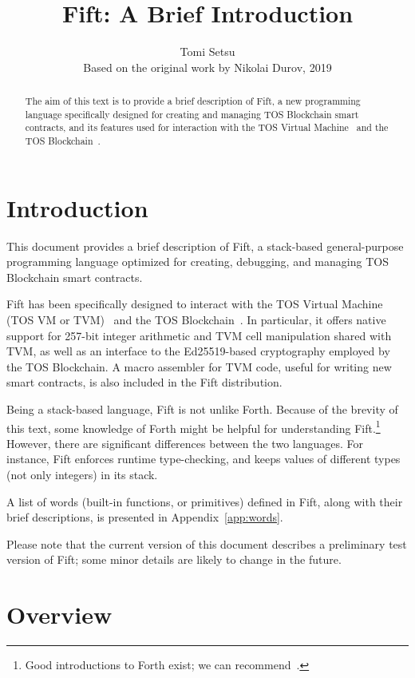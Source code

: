 \documentclass[12pt,oneside]{article}
\title{Fift: A Brief Introduction}
\author{Tomi Setsu\\[0.3em]
\small Based on the original work by Nikolai Durov, 2019}
\def\markbothsame#1{\fancyhead[C]{#1}}
\def\mysection#1{\section{#1}\fancyhead[C]{\textsc{Chapter \textbf{\thesection.} #1}}}
\begin{document}
\maketitle

\begin{abstract}
  The aim of this text is to provide a brief description of Fift, a new programming language specifically designed for creating and managing TOS Blockchain smart contracts, and its features used for interaction with the TOS Virtual Machine~\cite{TVM} and the TOS Blockchain~\cite{TBC}.
\end{abstract}

\section*{Introduction}
\markbothsame{Introduction}

This document provides a brief description of Fift, a stack-based general-purpose programming language optimized for creating, debugging, and managing TOS Blockchain smart contracts.

Fift has been specifically designed to interact with the TOS Virtual Machine (TOS VM or TVM)~\cite{TVM} and the TOS Blockchain~\cite{TBC}. In particular, it offers native support for 257-bit integer arithmetic and TVM cell manipulation shared with TVM, as well as an interface to the Ed25519-based cryptography employed by the TOS Blockchain. A macro assembler for TVM code, useful for writing new smart contracts, is also included in the Fift distribution.

Being a stack-based language, Fift is not unlike Forth. Because of the brevity of this text, some knowledge of Forth might be helpful for understanding Fift.\footnote{Good introductions to Forth exist; we can recommend~\cite{Brodie}.} However, there are significant differences between the two languages. For instance, Fift enforces runtime type-checking, and keeps values of different types (not only integers) in its stack.

A list of words (built-in functions, or primitives) defined in Fift, along with their brief descriptions, is presented in Appendix~\ref{app:words}.

Please note that the current version of this document describes a preliminary test version of Fift; some minor details are likely to change in the future.

\clearpage
\tableofcontents

\clearpage
\mysection{Overview}\label{sect:overview}
\end{document}
